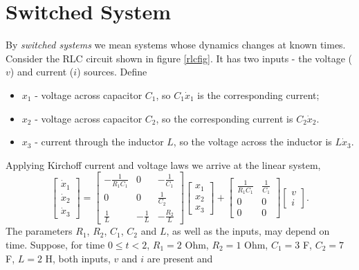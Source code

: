 \section{Switched System}
By {\it switched systems} we mean systems whose dynamics
changes at known times. Consider the RLC circuit shown in figure \ref{rlcfig}.
It has two inputs - the voltage ($v$) and current ($i$) sources.
Define
\begin{itemize}
\item $x_1$ - voltage across capacitor $C_1$, so $C_1\dot{x}_1$ is
the corresponding current;
\item $x_2$ - voltage across capacitor $C_2$, so the corresponding
current is $C_2\dot{x}_2$.
\item $x_3$ - current through the inductor $L$, so the voltage across
the inductor is $L\dot{x}_3$.
\end{itemize}
Applying Kirchoff current and voltage laws we arrive at the linear system,
\begin{equation}
\left[\begin{array}{c}
\dot{x}_1\\
\dot{x}_2\\
\dot{x}_3\end{array}\right] = \left[\begin{array}{ccc}
-\frac{1}{R_1C_1} & 0 & -\frac{1}{C_1}\\
0 & 0 & \frac{1}{C_2}\\
\frac{1}{L} & -\frac{1}{L} & -\frac{R_2}{L}\end{array}\right]
\left[\begin{array}{c}
x_1\\
x_2\\
x_3\end{array}\right] + \left[\begin{array}{cc}
\frac{1}{R_1C_1} & \frac{1}{C_1}\\
0 & 0\\
0 & 0\end{array}\right]\left[\begin{array}{c}
v\\
i\end{array}\right]. \label{rlceq}
\end{equation}
The parameters $R_1$, $R_2$, $C_1$, $C_2$ and $L$, as well as the inputs,
may depend on time. Suppose, for time $0\leq t<2$, $R_1=2$ Ohm, $R_2=1$ Ohm,
$C_1=3$ F, $C_2=7$ F, $L=2$ H, both inputs, $v$ and $i$ are present and
